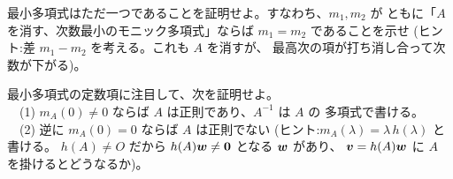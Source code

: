 \begin{mondai}[証明]\label{q:ch-ex11}
最小多項式はただ一つであることを証明せよ。すなわち、$m_1, m_2$ が
ともに「$A$ を消す、次数最小のモニック多項式」ならば
$m_1 = m_2$ であることを示せ
(ヒント:差 $m_1 - m_2$ を考える。これも $A$ を消すが、
最高次の項が打ち消し合って次数が下がる)。
\end{mondai}

\begin{mondai}[証明]\label{q:ch-ex12}
最小多項式の定数項に注目して、次を証明せよ。\\
　(1) $m_A(0) \neq 0$ ならば $A$ は正則であり、$A^{-1}$ は $A$ の
多項式で書ける。\\
　(2) 逆に $m_A(0) = 0$ ならば $A$ は正則でない
(ヒント:$m_A(\lambda) = \lambda\,h(\lambda)$ と書ける。
$h(A) \neq O$ だから $h(A)\bm{w} \neq \bm{0}$ となる $\bm{w}$ があり、
$\bm{v} = h(A)\bm{w}$ に $A$ を掛けるとどうなるか)。
\end{mondai}

